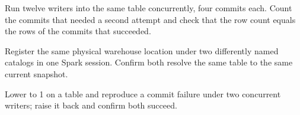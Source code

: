 \exercisehead
\begin{exercises}
\item Run twelve writers into the same table concurrently, four commits each.
      Count the commits that needed a second attempt and check that the row count
      equals the rows of the commits that succeeded.
\item Register the same physical warehouse location under two differently
      named catalogs in one Spark session. Confirm both resolve the same
      table to the same current snapshot.
\item Lower  to 1 on a table and reproduce a
      commit failure under two concurrent writers; raise it back and confirm
      both succeed.
\end{exercises}
